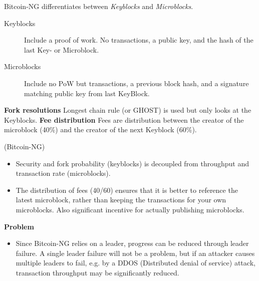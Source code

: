 \begin{definition} Bitcoin-NG differentiates between \emph{Keyblocks} and \emph{Microblocks}. 
	\begin{description}
		\item[Keyblocks] Include a proof of work. No transactions, a public key, and the hash of the last Key- or Microblock.
		\item[Microblocks] Include no PoW but transactions, a previous block hash, and a signature matching public key from last KeyBlock.
	\end{description}

	\noindent
	\textbf{Fork resolutions} Longest chain rule (or GHOST) is used but only looks at the Keyblocks.
	\textbf{Fee distribution} Fees are distribution between the creator of the microblock (40\%) and the creator of the next Keyblock (60\%).
\end{definition}

\begin{note} 
	(Bitcoin-NG)\newline
	
	
	\begin{itemize}
		\item Security and fork probability (keyblocks) is decoupled from throughput and transaction rate (microblocks).
		\item The distribution of fees (40/60) ensures that it is better to reference the latest microblock, rather than keeping the transactions for your own microblocks. Also significant incentive for actually publishing microblocks.
	\end{itemize}

\noindent	
\textbf{Problem}
	\begin{itemize}
		\item Since Bitcoin-NG relies on a leader, progress can be reduced through leader failure. A single leader failure will not be a problem, but if an attacker causes multiple leaders to fail, e.g. by a DDOS (Distributed denial of service) attack, transaction throughput may be significantly reduced.
	\end{itemize}
\end{note}

